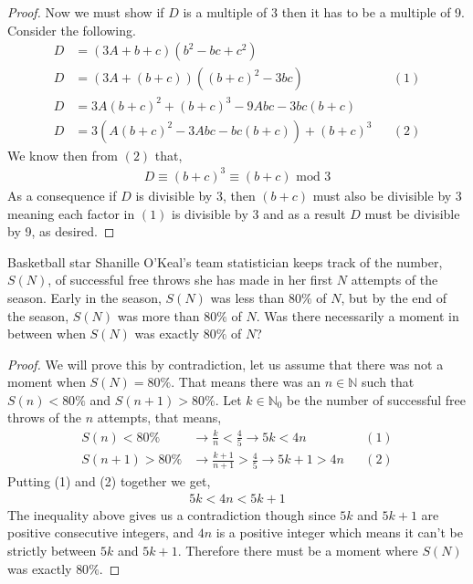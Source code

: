 \documentclass[11pt]{article}
\newenvironment{problem}[2][Problem\!]{\begin{trivlist}
\item[\hskip \labelsep {\bfseries #1}\hskip \labelsep {\bfseries #2}]}{\end{trivlist}}
\newcommand{\nn}{\mathbb N}   %
\begin{document}
\begin{proof}
    Now we must show if $D$ is a multiple of $3$ then it has to be a multiple of 9. Consider the following. 
    \begin{align*}
        D &= (3A + b + c)(b^{2} - bc + c^{2}) \\
        D &= (3A + (b + c))((b+c)^{2}-3bc) && (1) \\
        D &= 3A(b+c)^{2} + (b+c)^{3} -9Abc -3bc(b+c) \\
        D &= 3(A(b+c)^{2} -3Abc -bc(b+c)) + (b+c)^{3} && (2)
     \end{align*}
     We know then from $(2)$ that,
     \begin{align*}
         D \equiv (b+c)^{3} \equiv (b+c) \text{ mod } 3
     \end{align*}
     As a consequence if $D$ is divisible by 3, then $(b+c)$ must also be divisible by 3 meaning each factor in $(1)$ is divisible by 3 and as a result $D$ must be divisible by 9, as desired.
\end{proof}

\begin{tcolorbox}
    \begin{problem} {IC | 12/01 | PP 36}
        Basketball star Shanille O'Keal's team statistician keeps track of the number, $S(N)$, of successful free throws she has made in her first $N$ attempts of the season. Early in the season, $S(N)$ was less than $80\%$ of $N$, but by the end of the season, $S(N)$ was more than $80\%$ of $N$. Was there necessarily a moment in between when $S(N)$ was exactly $80\%$ of $N$?
    \end{problem}
\end{tcolorbox}
\begin{proof}
    We will prove this by contradiction, let us assume that there was not a moment when $S(N) = 80\%$. That means there was an $n \in \nn$ such that $S(n) < 80\%$ and $S(n +1) > 80\%$. Let $k\in \nn_0$ be the number of successful free throws of the $n$ attempts, that means,
    \begin{align*}
        S(n) < 80\% &\rightarrow \frac{k}{n} < \frac{4}{5} \rightarrow 5k < 4n &&(1)\\
        S(n+1) > 80\% &\rightarrow \frac{k+1}{n+1} > \frac{4}{5} \rightarrow  5k +1 > 4n && (2) 
    \end{align*}
    Putting (1) and (2) together we get,
    \begin{align*}
        5k < 4n < 5k+1
    \end{align*}
    The inequality above gives us a contradiction though since $5k$ and $5k+1$ are positive consecutive integers, and $4n$ is a positive integer which means it can't be strictly between $5k$ and $5k +1$. Therefore there must be a moment where $S(N)$ was exactly $80 \%$.
\end{proof}
\end{document}
